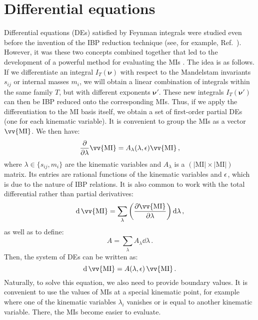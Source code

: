 \documentclass[main.tex]{subfiles}
\begin{document}
\section{Differential equations} \label{sec:DEs}
Differential equations (DEs) satisfied by Feynman integrals were studied even before the invention of the IBP reduction technique (see, for example, Ref.~\cite{Golubeva:1976}). However, it was these two concepts combined together that led to the development of a powerful method for evaluating the MIs \cite{Kotikov:1990kg, Kotikov:1991314, Bern:1993kr, Remiddi:1997ny, Gehrmann:1999as}. The idea is as follows. If we differentiate an integral $I_T(\bm{\nu})$ with respect to the Mandelstam invariants $s_{ij}$ or internal masses $m_i$, we will obtain a linear combination of integrals within the same family $T$, but with different exponents $\bm{\nu}'$. These new integrals $I_T(\bm{\nu}')$ can then be IBP reduced onto the corresponding MIs. Thus, if we apply the differentiation to the MI basis itself, we obtain a set of first-order partial DEs (one for each kinematic variable). It is convenient to group the MIs as a vector $\vv{\text{MI}}$. We then have:
\begin{equation} \label{eq:DEspartial}
    \frac{\partial}{\partial \lambda} \vv{\text{MI}} = A_{\lambda}(\lambda, \eps) \vv{\text{MI}}\,,
\end{equation}
where $\lambda \in \{s_{ij}, m_i\}$ are the kinematic variables and $A_\lambda$ is a $\left(|\text{MI}| \times |\text{MI}|\right)$ matrix. Its entries are rational functions of the kinematic variables and $\epsilon$, which is due to the nature of IBP relations. It is also common to work with the total differential rather than partial derivatives:
\begin{equation}
    \dd \,\vv{\text{MI}} = \sum_{\lambda} \left(\frac{\partial \vv{\text{MI}}}{\partial \lambda} \right) \dd \lambda\,,
\end{equation}
as well as to define:
\begin{equation}
    A = \sum_\lambda A_\lambda \dd\lambda\,.
\end{equation}
Then, the system of DEs can be written as:
\begin{equation} \label{eq:DEsoneform}
    \dd \,\vv{\text{MI}} = A(\lambda, \eps) \,\vv{\text{MI}}\,.
\end{equation}
Naturally, to solve this equation, we also need to provide boundary values. It is convenient to use the values of MIs at a special kinematic point, for example where one of the kinematic variables $\lambda_i$ vanishes or is equal to another kinematic variable. There, the MIs become easier to evaluate. 
\end{document}
